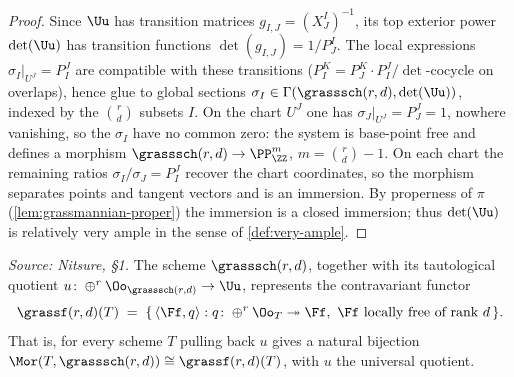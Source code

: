 \begin{proof}
  Since $\Uu$ has transition matrices $g_{I,J} = (X^I_J)^{-1}$, its top exterior
  power $\det(\Uu)$ has transition functions $\det(g_{I,J}) = 1/P^I_J$. The local
  expressions $\sigma_I|_{U^J} = P^J_I$ are compatible with these transitions
  ($P^K_I = P^K_J\cdot P^J_I/\!\det$-cocycle on overlaps), hence glue to global
  sections $\sigma_I\in\Gamma(\grasssch(r,d),\det(\Uu))$, indexed by the
  $\binom{r}{d}$ subsets $I$. On the chart $U^J$ one has $\sigma_J|_{U^J} =
  P^J_J = 1$, nowhere vanishing, so the $\sigma_I$ have no common zero: the
  system is base-point free and defines a morphism
  $\grasssch(r,d)\to\PP^m_{\ZZ}$, $m = \binom{r}{d}-1$. On each chart the
  remaining ratios $\sigma_I/\sigma_J = P^J_I$ recover the chart coordinates, so
  the morphism separates points and tangent vectors and is an immersion. By
  properness of $\pi$ (\cref{lem:grassmannian-proper}) the immersion is a closed
  immersion; thus $\det(\Uu)$ is relatively very ample in the sense of
  \cref{def:very-ample}.
\end{proof}

\begin{theorem}
  \label{thm:grassmannian-represents}
  \textit{Source: Nitsure, §1.}
  The scheme $\grasssch(r,d)$, together with its tautological quotient
  $u\colon\oplus^r\Oo_{\grasssch(r,d)}\to\Uu$, represents the contravariant
  functor
  \[
    \grassf(r,d)(T) \;=\;
    \{\,\langle\Ff,q\rangle : q\colon\oplus^r\Oo_T\twoheadrightarrow\Ff,\
    \Ff \text{ locally free of rank } d\,\}.
  \]
  That is, for every scheme $T$ pulling back $u$ gives a natural bijection
  $\Mor(T,\grasssch(r,d))\cong\grassf(r,d)(T)$, with $u$ the universal quotient.
\end{theorem}

